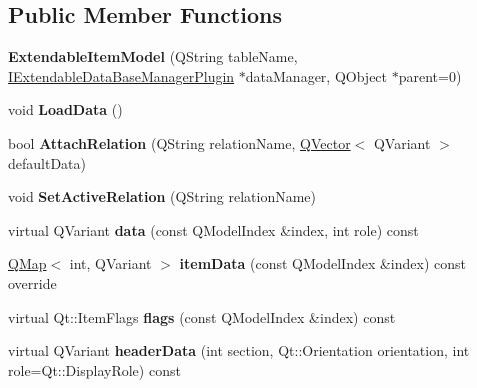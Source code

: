 \subsection*{Public Member Functions}
\begin{DoxyCompactItemize}
\item 
\mbox{\label{class_extendable_item_model_a896f75df752535510036e0c5d42fac8a}} 
{\bfseries Extendable\+Item\+Model} (Q\+String table\+Name, \hyperlink{class_i_extendable_data_base_manager_plugin}{I\+Extendable\+Data\+Base\+Manager\+Plugin} $\ast$data\+Manager, Q\+Object $\ast$parent=0)
\item 
\mbox{\label{class_extendable_item_model_ae5887f5d5086a094d712e2f7a1f6b84b}} 
void {\bfseries Load\+Data} ()
\item 
\mbox{\label{class_extendable_item_model_a49139d270880dc35b44b51bd95a36e89}} 
bool {\bfseries Attach\+Relation} (Q\+String relation\+Name, \hyperlink{class_q_vector}{Q\+Vector}$<$ Q\+Variant $>$ default\+Data)
\item 
\mbox{\label{class_extendable_item_model_ad5ce2033c7ba133259dc5c46a98e4694}} 
void {\bfseries Set\+Active\+Relation} (Q\+String relation\+Name)
\item 
\mbox{\label{class_extendable_item_model_a7b8f0527a5d89bf515e4ba1177294e4e}} 
virtual Q\+Variant {\bfseries data} (const Q\+Model\+Index \&index, int role) const
\item 
\mbox{\label{class_extendable_item_model_ae75da3ede02d0f81e3a3523a99d9306f}} 
\hyperlink{class_q_map}{Q\+Map}$<$ int, Q\+Variant $>$ {\bfseries item\+Data} (const Q\+Model\+Index \&index) const override
\item 
\mbox{\label{class_extendable_item_model_af798eeed6826786f0c576e1f4547f191}} 
virtual Qt\+::\+Item\+Flags {\bfseries flags} (const Q\+Model\+Index \&index) const
\item 
\mbox{\label{class_extendable_item_model_a6b518f098fad1c4a3e20ac5ea02f467b}} 
virtual Q\+Variant {\bfseries header\+Data} (int section, Qt\+::\+Orientation orientation, int role=Qt\+::\+Display\+Role) const

\end{DoxyCompactItemize}
